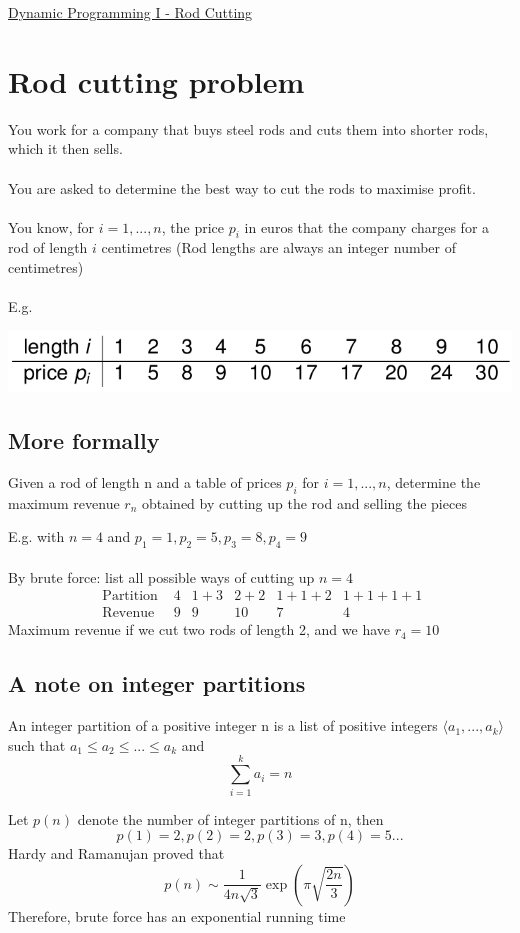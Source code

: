 \documentclass{article}[18pt]
\begin{document}
\begin{center}
\underline{\huge Dynamic Programming I - Rod Cutting}
\end{center}
\section{Rod cutting problem}
You work for a company that buys steel rods and cuts them into shorter rods, which it then sells.\\
\\
You are asked to determine the best way to cut the rods to maximise profit.\\
\\
You know, for $i=1,...,n$, the price $p_i$ in euros that the company charges for a rod of length $i$ centimetres (Rod lengths are always an integer number of centimetres)\\
\\
E.g.
\begin{center}
	\includegraphics[scale=0.7]{Rod}
\end{center}
\subsection{More formally}
\begin{defin}
Given a rod of length n and a table of prices $p_i$ for $i=1,...,n$, determine the maximum revenue $r_n$ obtained by cutting up the rod and selling the pieces
\end{defin}
E.g. with $n=4$ and $p_1=1, p_2=5, p_3=8, p_4=9$\\
\\
By brute force: list all possible ways of cutting up $n=4$
\[
\begin{array}{c|c|c|c|c|c|c}{\text { Partition }} & {4} & {1+3} & {2+2} & {1+1+2} & {1+1+1+1} \\ \hline \text { Revenue } & {9} & {9} & {10} & {7} & {4}\end{array}
\]
Maximum revenue if we cut two rods of length 2, and we have $r_4=10$
\subsection{A note on integer partitions}
\begin{defin}
An integer partition of a positive integer n is a list of positive integers $\langle a_1,...,a_k \rangle$ such that $a_1\leqslant a_2\leqslant ... \leqslant a_k$ and
\[
\sum_{i=1}^{k} a_{i}=n
\]	
\end{defin}
Let $p(n)$ denote the number of integer partitions of n, then
$$p(1)=2, p(2)=2, p(3)=3, p(4)=5...$$
Hardy and Ramanujan proved that
\[
p(n) \sim \frac{1}{4 n \sqrt{3}} \exp (\pi \sqrt{\frac{2 n}{3}})
\]
Therefore, brute force has an exponential running time
\end{document}
